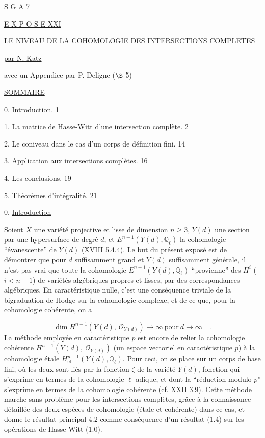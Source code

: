 


S G A  7


\underline{E X P O S E  XXI}


\underline{\underline{LE NIVEAU DE LA COHOMOLOGIE DES INTERSECTIONS COMPLETES}}

\underline{par N. Katz}

avec un Appendice \quad par P. Deligne ($\S$ 5)


\underline{SOMMAIRE}

0.  Introduction. \hfill 1

1.  La matrice de Hasse-Witt d'une intersection complète. \hfill 2

2.  Le coniveau dans le cas d'un corps de définition fini. \hfill 14

3.  Application aux intersections complètes. \hfill 16

4.  Les conclusions. \hfill 19

5.  Théorèmes d'intégralité. \hfill 21




0. \underline{Introduction}

Soient $X$ une variété projective et lisse de dimension $n \geq 3$, $Y(d)$ une section par une hypersurface de degré $d$, et $E^{n-1}(Y(d),\mathbb{Q}_\ell)$ la cohomologie ``évanescente'' de $Y(d)$ (XVIII 5.4.4). Le but du présent exposé est de démontrer que pour $d$ suffisamment grand et $Y(d)$ suffisamment générale, il n'est pas vrai que toute la cohomologie $E^{n-1}(Y(d),\mathbb{Q}_\ell)$ ``provienne'' des $H^i$ ($i < n-1$) de variétés algébriques propres et lisses, par des correspondances algébriques. En caractéristique nulle, c'est une conséquence triviale de la bigraduation de Hodge sur la cohomologie complexe, et de ce que, pour la cohomologie cohérente, on a

\begin{equation*}
\dim H^{n-1}(Y(d),\ \mathcal{O}_{Y(d)}) \longrightarrow \infty \ \mbox{pour} \ d \longrightarrow \infty \quad .
\end{equation*}
La méthode employée en caractéristique $p$ est encore de relier la cohomologie cohérente $H^{n-1}(Y(d),\ \mathcal{O}_{Y(d)})$ (un espace vectoriel en caractéristique $p$) à la cohomologie étale $H^{n-1}_{\mathrm{et}}(Y(d),\mathbb{Q}_\ell)$. Pour ceci, on se place sur un corps
de base fini, où les deux sont liés par la fonction $\zeta$ de la variété $Y(d)$, fonction qui s'exprime en termes de la cohomologie $\ell$-adique, et dont la ``réduction modulo $p$'' s'exprime en termes de la cohomologie cohérente (cf. XXII 3.9). Cette méthode marche sans problème pour les intersections complètes, grâce à la connaissance détaillée des deux espèces de cohomologie (étale et cohérente) dans ce cas, et donne le résultat principal 4.2 comme conséquence d'un résultat (1.4) sur les opérations de Hasse-Witt (1.0).

